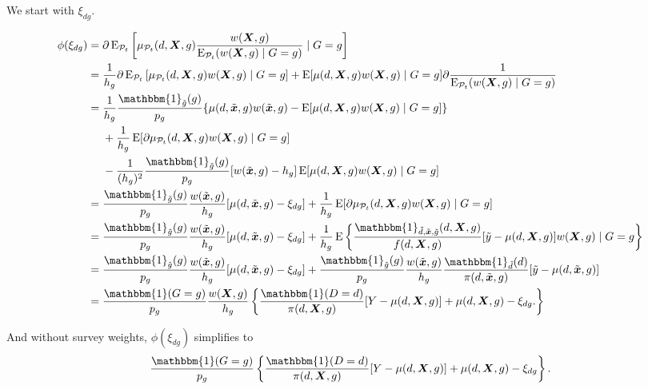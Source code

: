 \documentclass[12pt,a4paper]{article}
\newcommand{\E}{\operatorname{E}}
\def\X{{\boldsymbol X}}
\def\x{{\boldsymbol x}}
\def\one{\mathbbm{1}}
\begin{document}
We start with $\xi_{dg}$.

\begin{align*}
    \phi(\xi_{dg}) &= \partial \E_{\mathcal{P}_t} \left[\mu_{\mathcal{P}_t}(d,\X,g) \frac{w(\X,g)}{\E_{\mathcal{P}_t}(w(\X,g) \mid G=g)}  \mid G=g \right] \\
    &= \frac{1}{h_g} \partial \E_{\mathcal{P}_t} \left[\mu_{\mathcal{P}_t}(d,\X,g) w(\X,g)  \mid G=g \right] +  \E[\mu(d,\X,g)w(\X,g) \mid G=g] \partial \frac{1}{\E_{\mathcal{P}_t}(w(\X,g)\mid G=g)} \\
    &= \frac{1}{h_g}\frac{\one_{\Tilde{g}}(g)}{p_g}  \{\mu(d,\Tilde{\x},g)w(\Tilde{\x},g) -\E[\mu(d,\X,g)w(\X,g) \mid G=g]\}  \\
    &\phantom{{}={}} + \frac{1}{h_g} \E[\partial  \mu_{\mathcal{P}_t}(d,\X,g)w(\X,g) \mid G=g ]  \\ 
    &\phantom{{}={}} - \frac{1}{(h_g)^2}\frac{\one_{\Tilde{g}}(g)}{p_g}[w(\Tilde{\x},g)-h_g]\E[\mu(d,\X,g)w(\X,g) \mid G=g] \\
    &= \frac{\one_{\Tilde{g}}(g)}{p_g}  \frac{w(\Tilde{\x},g)}{h_g} [\mu(d,\Tilde{\x},g)-\xi_{dg}] + \frac{1}{h_g} \E[\partial  \mu_{\mathcal{P}_t}(d,\X,g)w(\X,g) \mid G=g ] \\
    &= \frac{\one_{\Tilde{g}}(g)}{p_g}  \frac{w(\Tilde{\x},g)}{h_g} [\mu(d,\Tilde{\x},g)-\xi_{dg}] + \frac{1}{h_g} \E \left\{ \frac{\one_{\Tilde{d},\Tilde{\x},\Tilde{g}}(d,\X,g)}{f(d,\X,g)} [\Tilde{y}-\mu(d,\X,g)] w(\X,g) \mid G=g \right\} \\
        &= \frac{\one_{\Tilde{g}}(g)}{p_g}  \frac{w(\Tilde{\x},g)}{h_g} [\mu(d,\Tilde{\x},g)-\xi_{dg}] + \frac{\one_{\Tilde{g}}(g)}{p_g} \frac{w(\Tilde{\x},g)}{h_g} \frac{\one_{\Tilde{d}}(d)}{\pi(d, \Tilde{\x},g)} [\Tilde{y}-\mu(d,\Tilde{\x},g)] \\
    &= \frac{\one(G=g)}{p_g}\frac{w(\X,g)}{h_g}\left\{ \frac{\one(D=d)}{\pi(d, \X,g)} [Y-\mu(d,\X,g)] + \mu(d,\X,g) - \xi_{dg}. \right\}
\end{align*}

And without survey weights, $\phi(\xi_{dg})$ simplifies to
$$\frac{\one(G=g)}{p_g} \left\{ \frac{\one(D=d)}{\pi(d, \X,g)} [Y-\mu(d,\X,g)] + \mu(d,\X,g) - \xi_{dg} \right\}.$$
\end{document}

